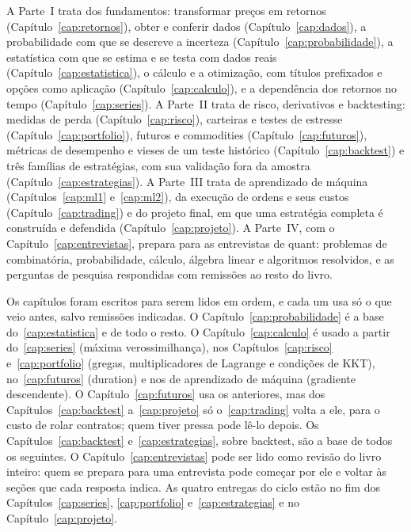 A Parte~I trata dos fundamentos: transformar preços em retornos (Capítulo~\ref{cap:retornos}), obter e conferir dados (Capítulo~\ref{cap:dados}), a probabilidade com que se descreve a incerteza (Capítulo~\ref{cap:probabilidade}), a estatística com que se estima e se testa com dados reais (Capítulo~\ref{cap:estatistica}), o cálculo e a otimização, com títulos prefixados e opções como aplicação (Capítulo~\ref{cap:calculo}), e a dependência dos retornos no tempo (Capítulo~\ref{cap:series}). A Parte~II trata de risco, derivativos e backtesting: medidas de perda (Capítulo~\ref{cap:risco}), carteiras e testes de estresse (Capítulo~\ref{cap:portfolio}), futuros e commodities (Capítulo~\ref{cap:futuros}), métricas de desempenho e vieses de um teste histórico (Capítulo~\ref{cap:backtest}) e três famílias de estratégias, com sua validação fora da amostra (Capítulo~\ref{cap:estrategias}). A Parte~III trata de aprendizado de máquina (Capítulos~\ref{cap:ml1} e~\ref{cap:ml2}), da execução de ordens e seus custos (Capítulo~\ref{cap:trading}) e do projeto final, em que uma estratégia completa é construída e defendida (Capítulo~\ref{cap:projeto}). A Parte~IV, com o Capítulo~\ref{cap:entrevistas}, prepara para as entrevistas de quant: problemas de combinatória, probabilidade, cálculo, álgebra linear e algoritmos resolvidos, e as perguntas de pesquisa respondidas com remissões ao resto do livro.

Os capítulos foram escritos para serem lidos em ordem, e cada um usa só o que veio antes, salvo remissões indicadas. O Capítulo~\ref{cap:probabilidade} é a base do~\ref{cap:estatistica} e de todo o resto. O Capítulo~\ref{cap:calculo} é usado a partir do~\ref{cap:series} (máxima verossimilhança), nos Capítulos~\ref{cap:risco} e~\ref{cap:portfolio} (gregas, multiplicadores de Lagrange e condições de KKT), no~\ref{cap:futuros} (duration) e nos de aprendizado de máquina (gradiente descendente). O Capítulo~\ref{cap:futuros} usa os anteriores, mas dos Capítulos~\ref{cap:backtest} a~\ref{cap:projeto} só o~\ref{cap:trading} volta a ele, para o custo de rolar contratos; quem tiver pressa pode lê-lo depois. Os Capítulos~\ref{cap:backtest} e~\ref{cap:estrategias}, sobre backtest, são a base de todos os seguintes. O Capítulo~\ref{cap:entrevistas} pode ser lido como revisão do livro inteiro: quem se prepara para uma entrevista pode começar por ele e voltar às seções que cada resposta indica. As quatro entregas do ciclo estão no fim dos Capítulos~\ref{cap:series}, \ref{cap:portfolio} e~\ref{cap:estrategias} e no Capítulo~\ref{cap:projeto}.

